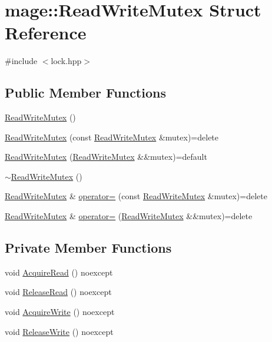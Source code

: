 \hypertarget{structmage_1_1_read_write_mutex}{}\section{mage\+:\+:Read\+Write\+Mutex Struct Reference}
\label{structmage_1_1_read_write_mutex}


{\ttfamily \#include $<$lock.\+hpp$>$}

\subsection*{Public Member Functions}
\begin{DoxyCompactItemize}
\item 
\hyperlink{structmage_1_1_read_write_mutex_aae10694de3862f2d1059477169883940}{Read\+Write\+Mutex} ()
\item 
\hyperlink{structmage_1_1_read_write_mutex_aacb2f69e7e2b084147e1e45628e9dd67}{Read\+Write\+Mutex} (const \hyperlink{structmage_1_1_read_write_mutex}{Read\+Write\+Mutex} \&mutex)=delete
\item 
\hyperlink{structmage_1_1_read_write_mutex_ab5cc5ca0afcca8a994c6468033a501bf}{Read\+Write\+Mutex} (\hyperlink{structmage_1_1_read_write_mutex}{Read\+Write\+Mutex} \&\&mutex)=default
\item 
\hyperlink{structmage_1_1_read_write_mutex_a73676d9414658d63edfe443ee1d55c8b}{$\sim$\+Read\+Write\+Mutex} ()
\item 
\hyperlink{structmage_1_1_read_write_mutex}{Read\+Write\+Mutex} \& \hyperlink{structmage_1_1_read_write_mutex_a408e06f3c8bcc644e43afbf7e9ac772f}{operator=} (const \hyperlink{structmage_1_1_read_write_mutex}{Read\+Write\+Mutex} \&mutex)=delete
\item 
\hyperlink{structmage_1_1_read_write_mutex}{Read\+Write\+Mutex} \& \hyperlink{structmage_1_1_read_write_mutex_a14ea4d1be75046741a7663e0d86a017a}{operator=} (\hyperlink{structmage_1_1_read_write_mutex}{Read\+Write\+Mutex} \&\&mutex)=delete
\end{DoxyCompactItemize}
\subsection*{Private Member Functions}
\begin{DoxyCompactItemize}
\item 
void \hyperlink{structmage_1_1_read_write_mutex_add04196fda61967f81901bcba79938bc}{Acquire\+Read} () noexcept
\item 
void \hyperlink{structmage_1_1_read_write_mutex_a4fbd8ad3d47e07307c31a4e212305744}{Release\+Read} () noexcept
\item 
void \hyperlink{structmage_1_1_read_write_mutex_ab99adb4241990fa0dd2d3ba03322d1c3}{Acquire\+Write} () noexcept
\item 
void \hyperlink{structmage_1_1_read_write_mutex_ad520a65bee5a8ac04671ee93895d9b28}{Release\+Write} () noexcept
\end{DoxyCompactItemize}
